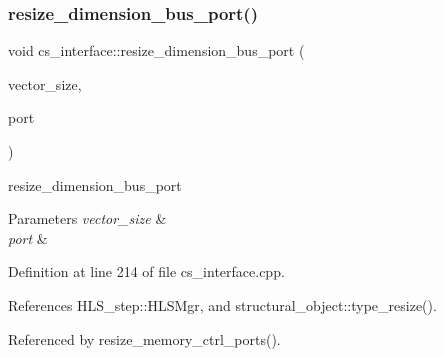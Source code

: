 \subsubsection{\texorpdfstring{resize\+\_\+dimension\+\_\+bus\+\_\+port()}{resize\_dimension\_bus\_port()}}
{\footnotesize\ttfamily void cs\+\_\+interface\+::resize\+\_\+dimension\+\_\+bus\+\_\+port (\begin{DoxyParamCaption}\item[{unsigned int}]{vector\+\_\+size,  }\item[{\hyperlink{structural__objects_8hpp_a8ea5f8cc50ab8f4c31e2751074ff60b2}{structural\+\_\+object\+Ref}}]{port }\end{DoxyParamCaption})\hspace{0.3cm}{\ttfamily [protected]}}



resize\+\_\+dimension\+\_\+bus\+\_\+port 


\begin{DoxyParams}{Parameters}
{\em vector\+\_\+size} & \\
\hline
{\em port} & \\
\hline
\end{DoxyParams}


Definition at line 214 of file cs\+\_\+interface.\+cpp.



References H\+L\+S\+\_\+step\+::\+H\+L\+S\+Mgr, and structural\+\_\+object\+::type\+\_\+resize().



Referenced by resize\+\_\+memory\+\_\+ctrl\+\_\+ports().


